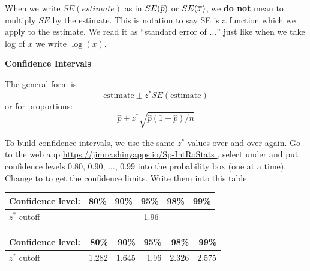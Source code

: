 When we write $SE(estimate)$ as in $SE(\widehat{p})$ or $SE(\overline{x})$, we {\bf
  do not} mean to multiply $SE$ by the estimate. This is notation to
say SE is a function which we apply to the estimate. We read it as
``standard error of $\ldots$'' just like when we take log of $x$ we
write $\log(x)$.  

  \begin{center}
    {\bf Confidence Intervals}
  \end{center}

The general form is 
$$ \mbox{estimate} \pm z^* SE(\mbox{estimate})$$
or for proportions:
$$ \widehat{p} \pm z^*\sqrt{\widehat{p}(1-\widehat{p})/n}$$

To build confidence intervals, we use the same $z^*$ values over and
over again.  Go to the web app
\url{https://jimrc.shinyapps.io/Sp-IntRoStats }, select
 under  and  put
confidence levels 0.80, 0.90, $\ldots$, 0.99 into the probability box
(one at a time).  Change  to
 to get the confidence limits. Write them into this
table.  \vspace{1cm}
 
\begin{students}
   \begin{tabular}{l|rrrrr}
    Confidence level: &  \hspace{1cm}80\% &  \hspace{1cm}90\% &  \hspace{1cm}95\% & \hspace{1cm} 98\% & \hspace{1cm} 99\% \\ \hline
    $z^*$ cutoff  &  &  & 1.96 &  & 
  \end{tabular}
\end{students}
\begin{key}
   \begin{tabular}{l|rrrrr}
    Confidence level: &  \hspace{1cm}80\% &  \hspace{1cm}90\% &  \hspace{1cm}95\% & \hspace{1cm} 98\% & \hspace{1cm} 99\% \\ \hline
    $z^*$ cutoff  &1.282  &1.645  & 1.96 &2.326& 2.575
  \end{tabular}
\end{key}


